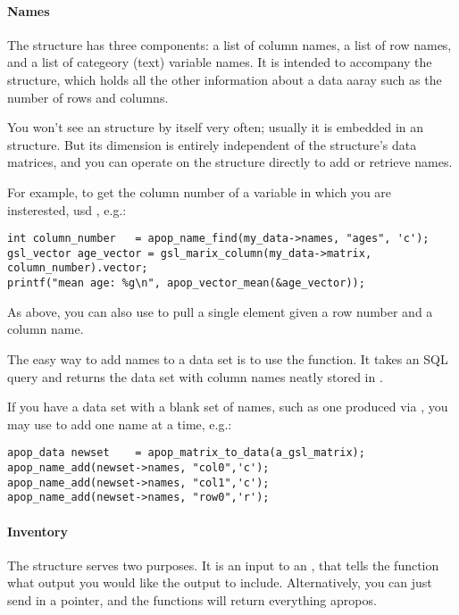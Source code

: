 \paragraph{Names}
The  structure has three components: a list of column
names, a list of row names, and a list of categeory (text) variable
names. It is intended to accompany the  structure,
which holds all the other information about a data aaray such as the
number of rows and columns.

You won't see an  structure by itself very often;
usually it is embedded in an  structure. But its
dimension is entirely independent of the  structure's
data matrices, and you can operate on the  structure
directly to add or retrieve names.

For example, to get the
column number of a variable in which you are insterested, usd , e.g.:
\begin{lstlisting}
int column_number   = apop_name_find(my_data->names, "ages", 'c');
gsl_vector age_vector = gsl_marix_column(my_data->matrix, column_number).vector;
printf("mean age: %g\n", apop_vector_mean(&age_vector));
\end{lstlisting}
As above, you can also use  to pull a single
element given a row number and a column name.

The easy way to add names to a data set is to use the 
 function. It takes an SQL query and returns
the data set with column names neatly stored in
.

If you have a data set with a blank set of names, such as one
produced via ,
you may use  to add one name at a
time, e.g.:
\begin{lstlisting}
apop_data newset    = apop_matrix_to_data(a_gsl_matrix);
apop_name_add(newset->names, "col0",'c');
apop_name_add(newset->names, "col1",'c');
apop_name_add(newset->names, "row0",'r');
\end{lstlisting}

\paragraph{Inventory}
The  structure serves two purposes. It is an input
to an , that tells the function what output you
would like the  output to include.  Alternatively, you
can just send in a  pointer, and the functions will return
everything apropos.

